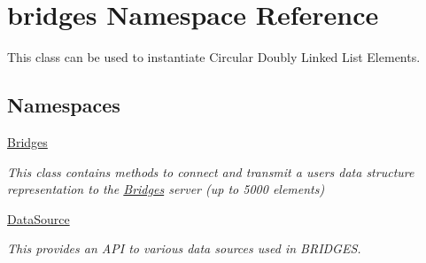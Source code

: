 \hypertarget{namespacebridges}{}\section{bridges Namespace Reference}
\label{namespacebridges}


This class can be used to instantiate Circular Doubly Linked List Elements.  


\subsection*{Namespaces}
\begin{DoxyCompactItemize}
\item 
 \hyperlink{namespacebridges_1_1_bridges}{Bridges}
\begin{DoxyCompactList}\small\item\em This class contains methods to connect and transmit a user\textquotesingle{}s data structure representation to the \hyperlink{namespacebridges_1_1_bridges}{Bridges} server (up to 5000 elements) \end{DoxyCompactList}\item 
 \hyperlink{namespacebridges_1_1_data_source}{Data\+Source}
\begin{DoxyCompactList}\small\item\em This provides an A\+PI to various data sources used in B\+R\+I\+D\+G\+ES. \end{DoxyCompactList}\end{DoxyCompactItemize}

